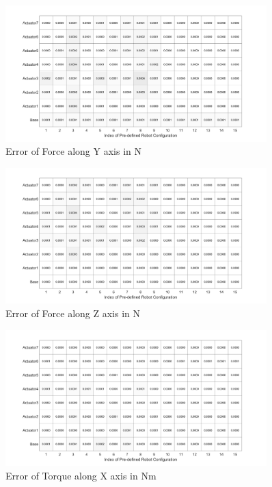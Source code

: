 \begin{figure}[H]
	\begin{center}
		\includegraphics[width=0.9\textwidth]{./images/ForceYErrorFB.png}%
		\caption{Error of Force along Y axis in N}
		\label{fig:ForceYErrorFB}%
	\end{center}
\end{figure}

\begin{figure}[H]
	\begin{center}
		\includegraphics[width=0.9\textwidth]{./images/ForceZErrorFB.png}%
		\caption{Error of Force along Z axis in N}
		\label{fig:ForceZErrorFB}%
	\end{center}
\end{figure}

\begin{figure}[H]
	\begin{center}
		\includegraphics[width=0.9\textwidth]{./images/TorqueXErrorFB.png}%
		\caption{Error of Torque along X axis in Nm}
		\label{fig:TorqueXErrorFB}%
	\end{center}
\end{figure}


